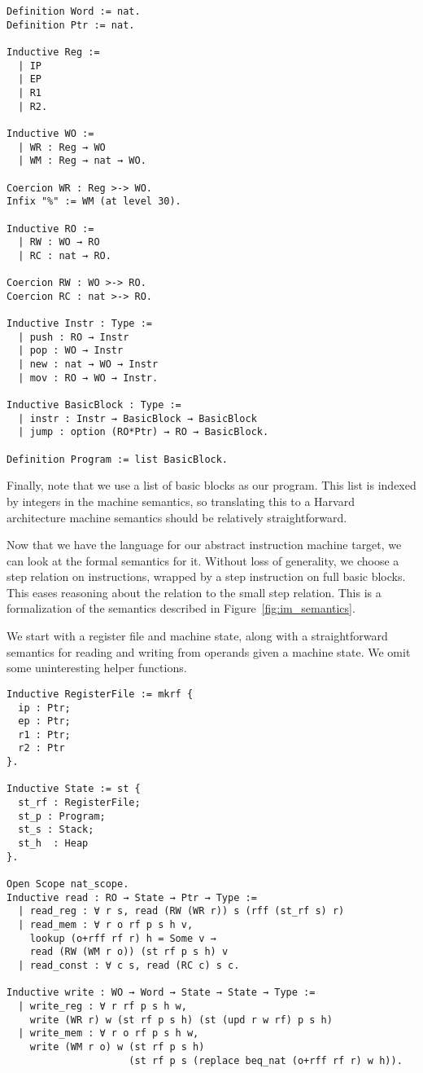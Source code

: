 \begin{verbatim}
Definition Word := nat.
Definition Ptr := nat.

Inductive Reg := 
  | IP
  | EP
  | R1
  | R2.

Inductive WO := 
  | WR : Reg → WO
  | WM : Reg → nat → WO.

Coercion WR : Reg >-> WO.
Infix "%" := WM (at level 30).

Inductive RO := 
  | RW : WO → RO
  | RC : nat → RO.

Coercion RW : WO >-> RO.
Coercion RC : nat >-> RO.

Inductive Instr : Type :=
  | push : RO → Instr
  | pop : WO → Instr
  | new : nat → WO → Instr 
  | mov : RO → WO → Instr.

Inductive BasicBlock : Type :=
  | instr : Instr → BasicBlock → BasicBlock
  | jump : option (RO*Ptr) → RO → BasicBlock.

Definition Program := list BasicBlock.
\end{verbatim}

Finally, note that we use a list of basic blocks as our program. This list is
indexed by integers in the machine semantics, so translating this to a Harvard 
architecture machine semantics should be relatively straightforward. 

Now that we have the language for our abstract instruction machine target, we
can look at the formal semantics for it. Without loss of generality, we choose a
step relation on instructions, wrapped by a step instruction on full basic
blocks. This eases reasoning about the relation to the small step \ce
relation. This is a formalization of the semantics described in
Figure~\ref{fig:im_semantics}. 

We start with a register file and machine state, along with a straightforward
semantics for reading and writing from operands given a machine state. We omit
some uninteresting helper functions. 

\begin{verbatim}
Inductive RegisterFile := mkrf {
  ip : Ptr;
  ep : Ptr;
  r1 : Ptr; 
  r2 : Ptr
}. 

Inductive State := st {
  st_rf : RegisterFile;
  st_p : Program;
  st_s : Stack;
  st_h  : Heap
}.

Open Scope nat_scope. 
Inductive read : RO → State → Ptr → Type :=
  | read_reg : ∀ r s, read (RW (WR r)) s (rff (st_rf s) r)
  | read_mem : ∀ r o rf p s h v, 
    lookup (o+rff rf r) h = Some v →
    read (RW (WM r o)) (st rf p s h) v
  | read_const : ∀ c s, read (RC c) s c.

Inductive write : WO → Word → State → State → Type :=
  | write_reg : ∀ r rf p s h w, 
    write (WR r) w (st rf p s h) (st (upd r w rf) p s h)
  | write_mem : ∀ r o rf p s h w, 
    write (WM r o) w (st rf p s h) 
                     (st rf p s (replace beq_nat (o+rff rf r) w h)).
\end{verbatim}

